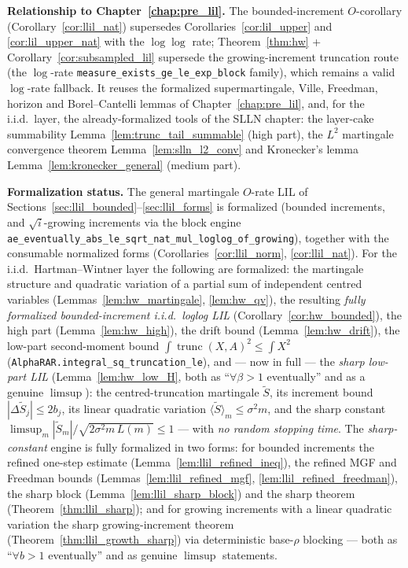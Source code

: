 \medskip
\noindent\textbf{Relationship to Chapter~\ref{chap:pre_lil}.} The bounded-increment
$O$-corollary (Corollary~\ref{cor:llil_nat}) supersedes Corollaries~\ref{cor:lil_upper}
and \ref{cor:lil_upper_nat} with the $\log\log$ rate; Theorem~\ref{thm:hw} +
Corollary~\ref{cor:subsampled_lil} supersede the growing-increment truncation route
(the $\log$-rate \texttt{measure\_exists\_ge\_le\_exp\_block} family), which remains a
valid $\log$-rate fallback. It reuses the
formalized supermartingale, Ville, Freedman, horizon and Borel--Cantelli lemmas of
Chapter~\ref{chap:pre_lil}, and, for the i.i.d.\ layer, the already-formalized tools of
the SLLN chapter: the layer-cake summability
Lemma~\ref{lem:trunc_tail_summable} (high part), the $L^2$ martingale convergence
theorem Lemma~\ref{lem:slln_l2_conv} and Kronecker's lemma
Lemma~\ref{lem:kronecker_general} (medium part).

\noindent\textbf{Formalization status.} The general martingale $O$-rate LIL of
Sections~\ref{sec:llil_bounded}--\ref{sec:llil_forms} is formalized (bounded increments, and
$\sqrt i$-growing increments via the block engine \texttt{ae\_eventually\_abs\_le\_sqrt\_nat\_mul\_loglog\_of\_growing}), together with the consumable normalized
forms (Corollaries~\ref{cor:llil_norm}, \ref{cor:llil_nat}). For the i.i.d.\ Hartman--Wintner layer
the following are formalized: the martingale structure and quadratic variation of a partial sum of
independent centred variables (Lemmas~\ref{lem:hw_martingale}, \ref{lem:hw_qv}), the resulting
\emph{fully formalized bounded-increment i.i.d.\ loglog LIL} (Corollary~\ref{cor:hw_bounded}), the
high part (Lemma~\ref{lem:hw_high}), the drift bound (Lemma~\ref{lem:hw_drift}), the low-part
second-moment bound $\int\operatorname{trunc}(X,A)^2\le\int X^2$
(\texttt{AlphaRAR.integral\_sq\_truncation\_le}), and --- now in full --- the \emph{sharp low-part
LIL} (Lemma~\ref{lem:hw_low_H}, both as ``$\forall\beta>1$ eventually'' and as a genuine $\limsup$):
the centred-truncation martingale $\tilde S$, its increment bound $|\Delta\tilde S_j|\le2b_j$, its
linear quadratic variation $\langle\tilde S\rangle_m\le\sigma^2 m$, and the sharp constant
$\limsup_m|\tilde S_m|/\sqrt{2\sigma^2 m\,L(m)}\le1$ --- with \emph{no random stopping time}.
The \emph{sharp-constant} engine is fully formalized in two forms: for bounded increments the refined
one-step estimate (Lemma~\ref{lem:llil_refined_ineq}), the refined MGF and Freedman bounds
(Lemmas~\ref{lem:llil_refined_mgf}, \ref{lem:llil_refined_freedman}), the sharp block
(Lemma~\ref{lem:llil_sharp_block}) and the sharp theorem (Theorem~\ref{thm:llil_sharp}); and for
growing increments with a linear quadratic variation the sharp growing-increment theorem
(Theorem~\ref{thm:llil_growth_sharp}) via deterministic base-$\rho$ blocking --- both as
``$\forall b>1$ eventually'' and as genuine $\limsup$ statements.

